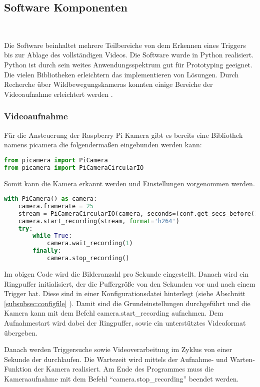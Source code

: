 \subsection{Software Komponenten} \
\label{subsec:evalsys_software}

Die Software beinhaltet mehrere Teilbereiche von dem Erkennen eines Triggers bis zur Ablage des vollständigen Videos. Die Software wurde in Python realisiert. Python ist durch sein weites Anwendungsspektrum gut für Prototyping geeignet. Die vielen Bibliotheken erleichtern das implementieren von Lösungen. Durch Recherche über Wildbewegungskameras konnten einige Bereiche der Videoaufnahme erleichtert werden \cite{rasp_ansteuerung}.

\subsubsection{Videoaufnahme}

Für die Ansteuerung der Raspberry Pi Kamera gibt es bereits eine Bibliothek namens picamera die folgendermaßen eingebunden werden kann:

\begin{lstlisting}[language=Python]
from picamera import PiCamera
from picamera import PiCameraCircularIO
\end{lstlisting}

Somit kann die Kamera erkannt werden und Einstellungen vorgenommen werden.

\begin{lstlisting}[language=Python]
with PiCamera() as camera:
	camera.framerate = 25
	stream = PiCameraCircularIO(camera, seconds=(conf.get_secs_before() + conf.get_secs_after()))
	camera.start_recording(stream, format='h264')
	try:
		while True:
			camera.wait_recording(1)	
		finally:
			camera.stop_recording()
\end{lstlisting}

Im obigen Code wird die Bilderanzahl pro Sekunde eingestellt. Danach wird ein Ringpuffer initialisiert, der die Puffergröße von den Sekunden vor und nach einem Trigger hat. Diese sind in einer Konfigurationsdatei hinterlegt (siehe Abschnitt \ref{subsubsec:configfile} ). Damit sind die Grundeinstellungen durchgeführt und die Kamera kann mit dem Befehl \glqq{} camera.start\_recording \grqq{} aufnehmen. Dem Aufnahmestart wird dabei der Ringpuffer, sowie ein unterstütztes Videoformat übergeben.

Danach werden Triggersuche sowie Videoverarbeitung im Zyklus von einer Sekunde der durchlaufen. Die Wartezeit wird mittels der Aufnahme- und Warten-Funktion der Kamera realisiert. Am Ende des Programmes muss die Kameraaufnahme mit dem Befehl "`camera.stop\_recording"' beendet werden.

